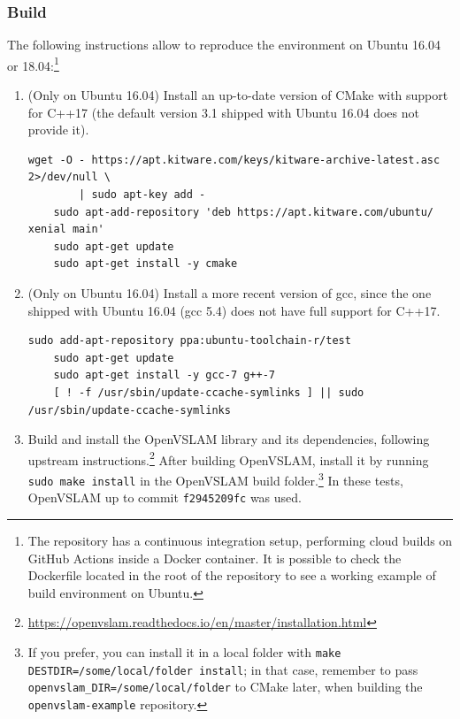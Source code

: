 \documentclass[11pt, letterpaper, twoside]{article}
\begin{document}
\subsubsection{Build}

The following instructions allow to reproduce the environment on Ubuntu 16.04
or 18.04:\footnote{The repository has a continuous integration setup,
performing cloud builds on GitHub Actions inside a Docker container. It is
possible to check the Dockerfile located in the root of the repository to see a
working example of build environment on Ubuntu.}
\begin{enumerate}
    \item (Only on Ubuntu 16.04) Install an up-to-date version of CMake with
        support for C++17 (the default version 3.1 shipped with Ubuntu 16.04
        does not provide it).
\begin{Verbatim}[samepage=true]
    wget -O - https://apt.kitware.com/keys/kitware-archive-latest.asc 2>/dev/null \
        | sudo apt-key add -
    sudo apt-add-repository 'deb https://apt.kitware.com/ubuntu/ xenial main'
    sudo apt-get update
    sudo apt-get install -y cmake
\end{Verbatim}

    \item (Only on Ubuntu 16.04) Install a more recent version of gcc, since
        the one shipped with Ubuntu 16.04 (gcc 5.4) does not have full support
        for C++17.
\begin{Verbatim}[samepage=true]
    sudo add-apt-repository ppa:ubuntu-toolchain-r/test
    sudo apt-get update
    sudo apt-get install -y gcc-7 g++-7
    [ ! -f /usr/sbin/update-ccache-symlinks ] || sudo /usr/sbin/update-ccache-symlinks
\end{Verbatim}

    \item Build and install the OpenVSLAM library and its dependencies,
        following upstream
        instructions.\footnote{\url{https://openvslam.readthedocs.io/en/master/installation.html}}
        After building OpenVSLAM, install it by running \texttt{sudo make
        install} in the OpenVSLAM build folder.\footnote{If you prefer,
        you can install it in a local folder with \texttt{make
        DESTDIR=/some/local/folder install}; in that case, remember to pass
        \texttt{openvslam\_DIR=/some/local/folder} to CMake later, when
        building the \texttt{openvslam-example} repository.} In these tests,
        OpenVSLAM up to commit \texttt{f2945209fc} was used.


\end{enumerate}
\end{document}
